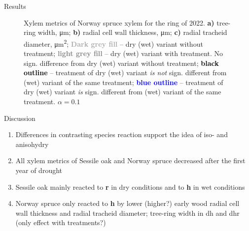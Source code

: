 \documentclass[final]{beamer}
\newlength{\colwidth}
\begin{document}
\begin{frame}[t]
\begin{columns}[t]
\begin{column}{\colwidth}
\begin{block}{Results}
\begin{figure}
    
    \caption{
        Xylem metrics of Norway spruce xylem for the ring of 2022.
        \textbf{a)} tree-ring width, \si{\micro\meter};
        \textbf{b)} radial cell wall thickness, \si{\micro\meter};
        \textbf{c)} radial tracheid diameter, \si{\micro\meter\squared};
        \textbf{\textcolor{darkgray}{Dark grey fill}} -- dry (wet) variant without treatment;
        \textbf{\textcolor{gray}{light grey fill}} -- dry (wet) variant with treatment. No sign. difference from dry (wet) variant without treatment;
        \textbf{\textcolor{black}{black outline}} -- treatment of dry (wet) variant \emph{is not} sign. different from (wet) variant of the same treatment;
        \textbf{\textcolor{blue}{blue outline}} -- treatment of dry (wet) variant \emph{is} sign. different from (wet) variant of the same treatment.
        $\alpha = 0.1$
    }
    \label{fig:spruce_box}
\end{figure}
\end{block}
 
\begin{block}{Discussion}
\begin{multicols}{2}
    \begin{enumerate}
        \item Differences in contrasting species reaction support the idea of iso- and anisohydry
        \item All xylem metrics of Sessile oak and Norway spruce decreased after the first year of drought
        \item Sessile oak mainly reacted to \textbf{r} in dry conditions and to \textbf{h} in wet conditions
        \item Norway spruce only reacted to \textbf{h} by lower (higher?) early wood radial cell wall thickness and radial tracheid diameter; tree-ring width in dh and dhr (only effect with treatments?)
    \end{enumerate}
\end{multicols}
\end{block}


\end{column}
\end{columns}
\end{frame}
\end{document}

